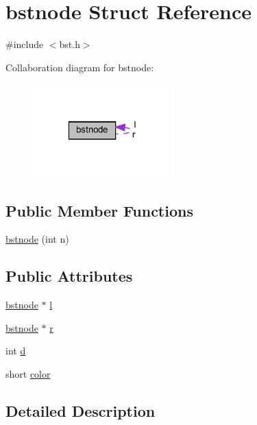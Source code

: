 \hypertarget{structbstnode}{\section{bstnode Struct Reference}
\label{structbstnode}
}


{\ttfamily \#include $<$bst.\-h$>$}



Collaboration diagram for bstnode\-:\nopagebreak
\begin{figure}[H]
\begin{center}
\leavevmode
\includegraphics[width=154pt]{structbstnode__coll__graph}
\end{center}
\end{figure}
\subsection*{Public Member Functions}
\begin{DoxyCompactItemize}
\item 
\hyperlink{structbstnode_a194e646d674fd6ef599167a516778c2e}{bstnode} (int n)
\end{DoxyCompactItemize}
\subsection*{Public Attributes}
\begin{DoxyCompactItemize}
\item 
\hyperlink{structbstnode}{bstnode} $\ast$ \hyperlink{structbstnode_abb747bf5628828f3086be95f12650265}{l}
\item 
\hyperlink{structbstnode}{bstnode} $\ast$ \hyperlink{structbstnode_ae28d7cda479c7ba7ad8a00e324e65447}{r}
\item 
int \hyperlink{structbstnode_ac25311e6d6edab15a711ac4229c15d41}{d}
\item 
short \hyperlink{structbstnode_aec5d2115e7332e800813f52137d4b58a}{color}
\end{DoxyCompactItemize}


\subsection{Detailed Description}


